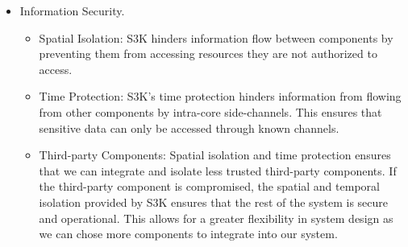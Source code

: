 \begin{itemize}
\begin{itemize}
		\end{itemize}
	\item Information Security.
		\begin{itemize}
			\item Spatial Isolation: 
				S3K hinders information flow between components by preventing them from accessing resources they are not authorized to access.
			\item Time Protection:
				S3K's time protection hinders information from flowing from other components by intra-core side-channels.
				This ensures that sensitive data can only be accessed through known channels.
			\item Third-party Components:
				Spatial isolation and time protection ensures that we can integrate and isolate less trusted third-party components.
				If the third-party component is compromised, the spatial and temporal isolation provided by S3K ensures that the rest of the system is secure and operational.
				This allows for a greater flexibility in system design as we can chose more components to integrate into our system.
		\end{itemize}
\end{itemize}

